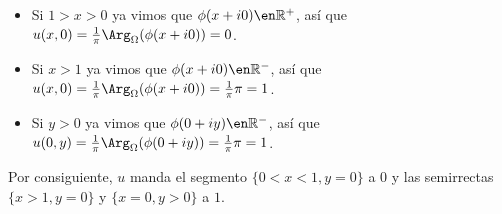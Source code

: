 \begin{sol}
\begin{itemize}[leftmargin=1em]
\item Si $1>x>0$ ya vimos que $\phi(x+i0) \en \mathbb{R}^+$, así que $u(x,0) = \frac{1}{\pi}\Arg_\Omega(\phi(x+i0)) = 0$.
\item Si $x>1$ ya vimos que $\phi(x+i0) \en \mathbb{R}^-$, así que $u(x,0) = \frac{1}{\pi}\Arg_\Omega(\phi(x+i0)) = \frac{1}{\pi}\pi = 1$.
\item Si $y>0$ ya vimos que $\phi(0+iy) \en \mathbb{R}^-$, así que $u(0,y) = \frac{1}{\pi}\Arg_\Omega(\phi(0+iy)) = \frac{1}{\pi}\pi = 1$.
\end{itemize}
Por consiguiente, $u$ manda el segmento $\{0<x<1,y=0\}$ a $0$ y las semirrectas $\{x>1,y=0\}$ y $\{x=0,y>0\}$ a $1$.
\end{sol}